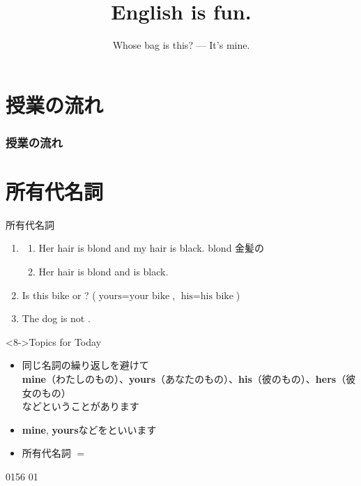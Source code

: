 \documentclass[aspectratio=169,xcolor={dvipsnames,table}]{beamer}
\title{English is fun.}
\subtitle{Whose bag is this? --- It's mine.}
\author{}
\institute[]{}
\date[]
\begin{document}
\begin{frame}[plain]
  \titlepage
\end{frame}

\section*{授業の流れ}
\begin{frame}[plain]
  \frametitle{授業の流れ}
  \tableofcontents
\end{frame}
\section{所有代名詞}
\begin{frame}[plain]{所有代名詞}
 
\begin{enumerate}
 \item<1-> \begin{enumerate}
	\item<1-> Her hair is blond and my hair is black.%
\hfill{}{\scriptsize blond  金髪の}
	\item<2-> Her hair is blond and  is black. \visible<3->{($\text{mine} = \text{my hair}$)}
       \end{enumerate}
 \item<4-> Is this bike  or ?  {($\text{yours} = \text{your bike}$, $\text{his} = \text{his bike}$)}
 \item<6-> The dog is not . 
\end{enumerate}

\vfill

\begin{block}<8->{Topics for Today}
\pause
\begin{itemize}[square]\small
 \item<8-> 同じ名詞の繰り返しを避けて\\
\textbf{mine}（わたしのもの）、\textbf{yours}（あなたのもの）、\textbf{his}（彼のもの）、\textbf{hers}（彼女のもの）\\
などということがあります
 \item<9-> \textbf{mine}, \textbf{yours}などをといいます
\item<10-> 所有代名詞 $=$ 
\end{itemize}
     \end{block}

\hfill{\tiny 0156}\,{\scriptsize {}\,01}

\end{frame}
\end{document}
